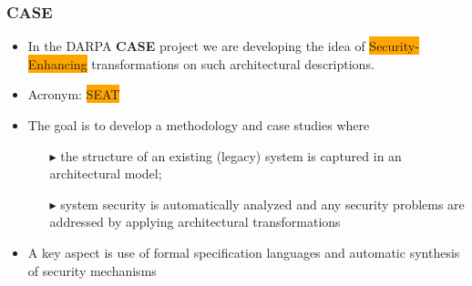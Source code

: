 \documentclass{beamer}
\newcommand{\kemph}[1]{\colorbox{orange}{#1}}
\begin{document}
\begin{frame}\frametitle{CASE}
\begin{itemize}

\item In the DARPA \textbf{CASE} project we are developing the idea of
  \kemph{Security-Enhancing} transformations on such architectural
  descriptions.

\item Acronym: \colorbox{orange}{SEAT}

\item The goal is to develop a methodology and case studies where
  \begin{itemize}
  \item [$\blacktriangleright$]
       the structure of an existing (legacy) system is captured in an architectural model;

 \item [$\blacktriangleright$] system security is automatically analyzed and any security
   problems are addressed by applying architectural transformations
 \end{itemize}

\item A key aspect is use of formal specification languages and
  automatic synthesis of security mechanisms

\end{itemize}

\end{frame}
\end{document}
